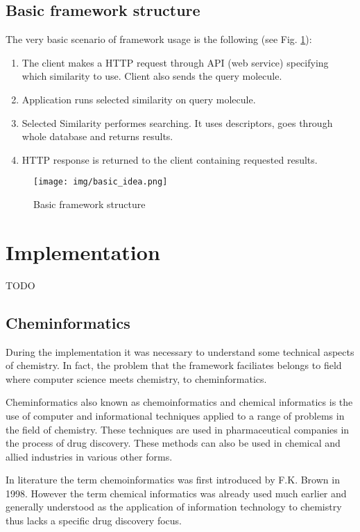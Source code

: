 \documentclass[thesis=M,english]{FITthesis}[2012/10/20]
\begin{document}
\section{Basic framework structure}
The very basic scenario of framework usage is the following (see Fig. \ref{fig:basic_idea}):
\begin{enumerate}
\item The client makes a HTTP request through API (web service) specifying which similarity to use. Client also sends the query molecule.
\item	Application runs selected similarity on query molecule.
\item	Selected Similarity performes searching. It uses descriptors, goes through whole database and returns results.
\item	HTTP response is returned to the client containing requested results.
\end{enumerate}

\begin{figure}
  \centering
  \texttt{[image: img/basic\_idea.png]}
  \caption{Basic framework structure}
  \label{fig:basic_idea}
\end{figure}


\chapter{Implementation}

TODO

\section{Cheminformatics}
During the implementation it was necessary to understand some technical aspects of chemistry. In fact, the problem that the framework faciliates belongs to field where computer science meets chemistry, to cheminformatics.

Cheminformatics also known as chemoinformatics and chemical informatics is the use of computer and informational techniques applied to a range of problems in the field of chemistry. These techniques are used in pharmaceutical companies in the process of drug discovery. These methods can also be used in chemical and allied industries in various other forms. \cite{wiki1}

In literature the term chemoinformatics was first introduced by F.K. Brown in 1998. However the term chemical informatics was already used much earlier and generally understood as the application of information technology to chemistry thus lacks a specific drug discovery focus.\cite{bunin}
\end{document}
